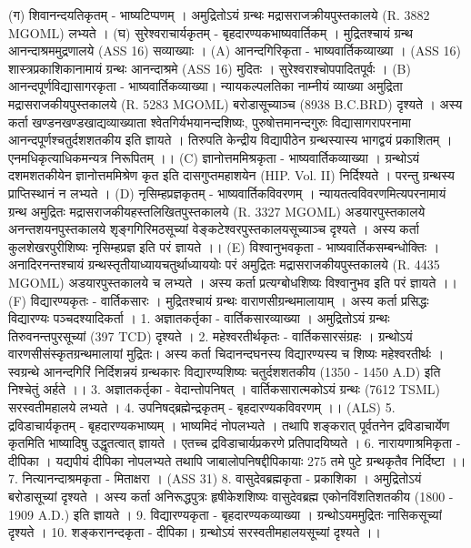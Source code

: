 (ग) शिवानन्दयतिकृतम् - भाष्यटिप्पणम् । अमुद्रितोऽयं ग्रन्थः मद्रासराजक्रीयपुस्तकालये (R. 3882 MGOML) लभ्यते । 
(घ) सुरेश्वराचार्यकृतम् - बृहदारण्यकभाष्यवार्तिकम् । मुद्रितश्चायं ग्रन्थ आनन्दाश्रममुद्रणालये (ASS 16) सव्याख्याः । 
(A) आनन्दगिरिकृता - भाष्यवार्तिकव्याख्या । (ASS 16)  शास्त्रप्रकाशिकानामायं ग्रन्थः आनन्दाश्रमे (ASS 16) मुदितः । सुरेश्वराश्चोपपादितपूर्वः । 
(B) आनन्दपूर्णविद्यासागरकृता - भाष्यवार्तिकव्याख्या। 
न्यायकल्पलतिका नाम्नीयं व्याख्या अमुद्रिता मद्रासराजकीयपुस्तकालये (R. 5283 MGOML) बरोडासूच्याञ्च (8938 B.C.BRD) दृश्यते । अस्य कर्ता खण्डनखण्डखाद्यव्याख्याता श्वेतगिर्यभयानन्दशिष्यः, पुरुषोत्तमानन्दगुरुः विद्यासागरापरनामा आनन्दपूर्णश्चतुर्दशशतकीय इति ज्ञायते । तिरुपति केन्द्रीय विद्यापीठेन ग्रन्थस्यास्य भागद्वयं प्रकाशितम् । एनमधिकृत्याधिकमन्यत्र निरूपितम् ।। 
(C) ज्ञानोत्तममिश्रकृता - भाष्यवार्तिकव्याख्या ।
ग्रन्थोऽयं दशमशतकीयेन ज्ञानोत्तममिश्रेण कृत इति दासगुप्तमहाशयेन (HIP. Vol. II) निर्दिश्यते । परन्तु ग्रन्थस्य प्राप्तिस्थानं न लभ्यते । 
(D) नृसिम्हप्रज्ञकृतम् - भाष्यवार्तिकविवरणम् ।
न्यायतत्वविवरणमित्यपरनामायं ग्रन्थ अमुद्रितः मद्रासराजकीयहस्तलिखितपुस्तकालये (R. 3327 MGOML) अडयारपुस्तकालये अनन्तशयनपुस्तकालये शृङ्गगिरिमठसूच्यां वेङ्कटेश्वरपुस्तकालयसूच्याञ्च दृश्यते । अस्य कर्ता कुलशेखरपुरीशिष्यः नृसिम्हप्रज्ञ इति परं ज्ञायते ।।
(E) विश्वानुभवकृता - भाष्यवार्तिकसम्बन्धोक्तिः । 
अनादिरनन्तश्चायं ग्रन्थस्तृतीयाध्यायचतुर्थाध्याययोः परं अमुद्रितः मद्रासराजकीयपुस्तकालये (R. 4435 MGOML) अडयारपुस्तकालये च लभ्यते । अस्य कर्ता प्रत्यग्बोधशिष्यः विश्वानुभव इति परं ज्ञायते ।।
(F) विद्यारण्यकृतः - वार्तिकसारः । मुद्रितश्चायं ग्रन्थः वाराणसीग्रन्थमालायाम् । अस्य कर्ता प्रसिद्धः विद्यारण्यः पञ्चदश्यादिकर्ता ।
1.  अज्ञातकर्तृका - वार्तिकसारव्याख्या । अमुद्रितोऽयं ग्रन्थः तिरुवनन्तपुरसूच्यां (397 TCD) दृश्यते ।
2. महेश्वरतीर्थकृतः - वार्तिकसारसंग्रहः ।
ग्रन्थोऽयं वारणसीसंस्कृतग्रन्थमालायां मुद्रितः। अस्य कर्ता चिदानन्दघनस्य विद्यारण्यस्य च शिष्यः महेश्वरतीर्थः । स्वग्रन्थे आनन्दगिरिं निर्दिशन्नयं ग्रन्थकारः विद्यारण्यशिष्यः चतुर्दशशतकीय (1350 - 1450 A.D) इति निश्चेतुं अर्हते ।। 
3.  अज्ञातकर्तृका - वेदान्तोपनिषत् । वार्तिकसारात्मकोऽयं ग्रन्थः (7612 TSML) सरस्वतीमहालये लभ्यते ।
4. उपनिषद्ब्रह्मेन्द्रकृतम् - बृहदारण्यकविवरणम् ।। (ALS)
5.  द्रविडाचार्यकृतम् - बृहदारण्यकभाष्यम् । 
भाष्यमिदं नोपलभ्यते । तथापि शङ्करात् पूर्वतनेन द्रविडाचार्येण कृतमिति भाष्यादिषु उद्धृतत्वात् ज्ञायते । एतच्च द्रविडाचार्यप्रकरणे प्रतिपादयिष्यते । 
6. नारायणाश्रमिकृता - दीपिका । यद्यपीयं दीपिका नोपलभ्यते तथापि जाबालोपनिषद्दीपिकायाः 275 तमे पुटे ग्रन्थकृतैव निर्दिष्टा ।। 
7. नित्यानन्दाश्रमकृता - मिताक्षरा । (ASS 31) 
8. वासुदेवब्रह्मकृता - प्रकाशिका । अमुद्रितोऽयं बरोडासूच्यां दृश्यते । अस्य कर्ता अनिरूद्धपुत्रः हृषीकेशशिष्यः वासुदेवब्रह्म एकोनविंशतिशतकीय (1800 - 1909 A.D.) इति ज्ञायते । 
9. विद्यारण्यकृता - बृहदारण्यकव्याख्या । ग्रन्थोऽयममुद्रितः नासिकसूच्यां दृश्यते ।
10. शङ्करानन्दकृता - दीपिका। ग्रन्थोऽयं सरस्वतीमहालयसूच्यां दृश्यते ।। 

